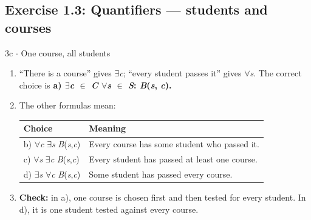 \documentclass[11pt]{article}
\begin{document}
\begin{keepsection}\subsection{Exercise 1.3: Quantifiers — students and courses}

\begin{workedbox}{3c \ensuremath{\cdot} One course, all students}
\begin{enumerate}
\item “There is a course” gives \ensuremath{\exists}\textit{c}; “every student passes it” gives \ensuremath{\forall}\textit{s}. The correct choice is \textbf{a) \ensuremath{\exists}\textit{c} \ensuremath{\in} \textit{C} \ensuremath{\forall}\textit{s} \ensuremath{\in} \textit{S}: \textit{B}(\textit{s}, \textit{c}).}
\item {}
The other formulas mean:

\begin{center}\small\begin{tabularx}{\linewidth}{>{\raggedright\arraybackslash}X>{\raggedright\arraybackslash}X}\toprule
\textbf{Choice} & \textbf{Meaning} \\ \midrule
b) \ensuremath{\forall}\textit{c} \ensuremath{\exists}\textit{s} \textit{B}(\textit{s},\textit{c}) & Every course has some student who passed it. \\
c) \ensuremath{\forall}\textit{s} \ensuremath{\exists}\textit{c} \textit{B}(\textit{s},\textit{c}) & Every student has passed at least one course. \\
d) \ensuremath{\exists}\textit{s} \ensuremath{\forall}\textit{c} \textit{B}(\textit{s},\textit{c}) & Some student has passed every course. \\
\bottomrule\end{tabularx}\end{center}
\item \textbf{Check:} in a), one course is chosen first and then tested for every student. In d), it is one student tested against every course.
\end{enumerate}
\end{workedbox}

\end{keepsection}
\end{document}
